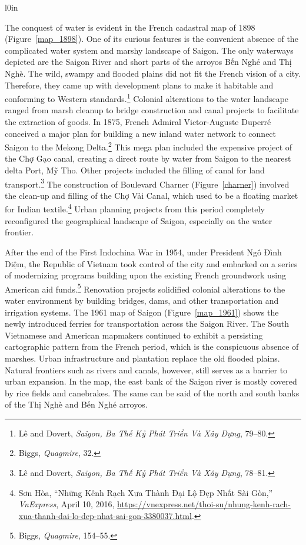 \en
\begin{wrapfigure}{l}{0in}
\caption[Boulevard Charner]{Boulevard Charner (marked red)}
\label{charner}
\end{wrapfigure}
The conquest of water is evident in the French cadastral map of 1898 (Figure~\ref{map_1898}). One of its curious features is the convenient absence of the complicated water system and marshy landscape of Saigon. The only waterways depicted are the Saigon River and short parts of the arroyos \vi Bến Nghé and Thị Nghè. The wild, swampy and flooded plains did not fit the French vision of a city. Therefore, they came up with development plans to make it habitable and conforming to Western standards.\footnote{Lê and Dovert, \textit{Saigon, Ba Thế Kỷ Phát Triển Và Xây Dựng}, 79–80.} Colonial alterations to the water landscape ranged from marsh cleanup to bridge construction and canal projects to facilitate the extraction of goods. In 1875, French Admiral Victor-Auguste Duperré conceived a major plan for building a new inland water network to connect Saigon to the Mekong Delta.\footnote{Biggs, \textit{Quagmire}, 32.} This mega plan included the expensive project of the Chợ Gạo canal, creating a direct route by water from Saigon to the nearest delta Port, Mỹ Tho. Other projects included the filling of canal for land transport.\footnote{Lê and Dovert, \textit{Saigon, Ba Thế Kỷ Phát Triển Và Xây Dựng}, 78–81.} The construction of Boulevard Charner (Figure~\ref{charner}) involved the clean-up and filling of the Chợ Vải Canal, which used to be a floating market for Indian textile.\footnote{Sơn Hòa, “Những Kênh Rạch Xưa Thành Đại Lộ Đẹp Nhất Sài Gòn,” \textit{VnExpress}, April 10, 2016, \url{https://vnexpress.net/thoi-su/nhung-kenh-rach-xua-thanh-dai-lo-dep-nhat-sai-gon-3380037.html}.} Urban planning projects from this period completely reconfigured the geographical landscape of Saigon, especially on the water frontier.

After the end of the First Indochina War in 1954, under President Ngô Đình Diệm, the Republic of Vietnam took control of the city and embarked on a series of modernizing programs building upon the existing French groundwork using American aid funds.\footnote{Biggs, \textit{Quagmire}, 154–55.} Renovation projects solidified colonial alterations to the water environment by building bridges, dams, and other transportation and irrigation systems. The 1961 map of Saigon (Figure~\ref{map_1961}) shows the newly introduced ferries for transportation across the Saigon River. The South Vietnamese and American mapmakers continued to exhibit a persisting cartographic pattern from the French period, which is the conspicuous absence of marshes. Urban infrastructure and plantation replace the old flooded plains. Natural frontiers such as rivers and canals, however, still serves as a barrier to urban expansion. In the map, the east bank of the Saigon river is mostly covered by rice fields and canebrakes. The same can be said of the north and south banks of the Thị Nghè and Bến Nghé arroyos.

